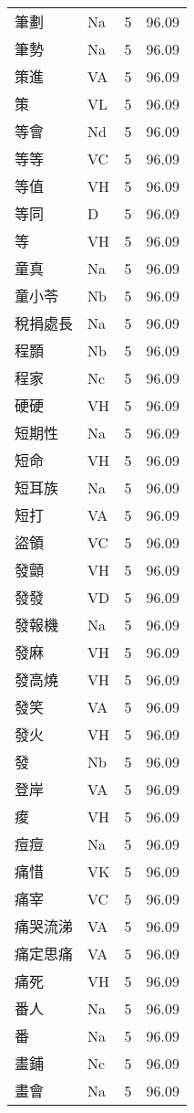 \documentclass[twocolumn]{book}
\begin{document}
\begin{supertabular}{llrr}
筆劃 & Na & 5 &  96.09\\
筆勢 & Na & 5 &  96.09\\
策進 & VA & 5 &  96.09\\
策 & VL & 5 &  96.09\\
等會 & Nd & 5 &  96.09\\
等等 & VC & 5 &  96.09\\
等值 & VH & 5 &  96.09\\
等同 & D & 5 &  96.09\\
等 & VH & 5 &  96.09\\
童真 & Na & 5 &  96.09\\
童小苓 & Nb & 5 &  96.09\\
稅捐處長 & Na & 5 &  96.09\\
程顥 & Nb & 5 &  96.09\\
程家 & Nc & 5 &  96.09\\
硬硬 & VH & 5 &  96.09\\
短期性 & Na & 5 &  96.09\\
短命 & VH & 5 &  96.09\\
短耳族 & Na & 5 &  96.09\\
短打 & VA & 5 &  96.09\\
盜領 & VC & 5 &  96.09\\
發顫 & VH & 5 &  96.09\\
發發 & VD & 5 &  96.09\\
發報機 & Na & 5 &  96.09\\
發麻 & VH & 5 &  96.09\\
發高燒 & VH & 5 &  96.09\\
發笑 & VA & 5 &  96.09\\
發火 & VH & 5 &  96.09\\
發 & Nb & 5 &  96.09\\
登岸 & VA & 5 &  96.09\\
痠 & VH & 5 &  96.09\\
痘痘 & Na & 5 &  96.09\\
痛惜 & VK & 5 &  96.09\\
痛宰 & VC & 5 &  96.09\\
痛哭流涕 & VA & 5 &  96.09\\
痛定思痛 & VA & 5 &  96.09\\
痛死 & VH & 5 &  96.09\\
番人 & Na & 5 &  96.09\\
番 & Na & 5 &  96.09\\
畫鋪 & Nc & 5 &  96.09\\
畫會 & Na & 5 &  96.09\\

\end{supertabular}
\end{document}

